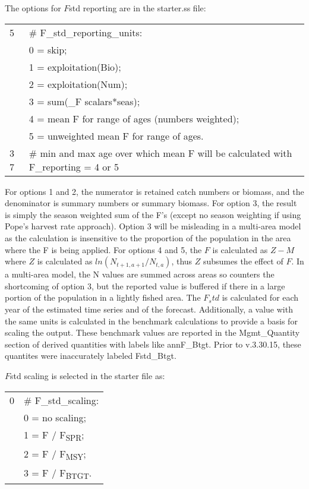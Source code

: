 The options for $F$std reporting are in the starter.ss file:
\begin{center}
	\begin{longtable}{p{2cm} p{12cm}}
		\hline
		5 & \# F\_std\_reporting\_units: \Tstrut\\
		  & 0 = skip; \\
		  & 1 = exploitation(Bio); \\
		  & 2 = exploitation(Num); \\ 
		  & 3 = sum(\_F scalars*seas); \\
		  & 4 = mean F for range of ages (numbers weighted); \\
		  & 5 = unweighted mean F for range of ages. \Bstrut\\
		\hline
		3 7 & \# min and max age over which mean F will be calculated with F\_reporting = 4 or 5 \Tstrut\Bstrut\\
		\hline
	\end{longtable}
\end{center}

For options 1 and 2, the numerator is retained catch numbers or biomass, and the denominator is summary numbers or summary biomass.
For option 3, the result is simply the season weighted sum of the F's (except no season weighting if using Pope's harvest rate approach). Option 3 will be misleading in a multi-area model as the calculation is insensitive to the proportion of the population in the area where the F is being applied.
For options 4 and 5, the $F$ is calculated as $Z-M$ where $Z$ is calculated as $ln(N_{t+1,a+1}/N_{t,a})$, thus $Z$ subsumes the effect of $F$.  In a multi-area model, the N values are summed across areas so counters the shortcoming of option 3, but the reported value is buffered if there in a large portion of the population in a lightly fished area.
The $F_std$ is calculated for each year of the estimated time series and of the forecast. Additionally, a value with the same units is calculated in the benchmark calculations to provide a basis for scaling the output. These benchmark values are reported in the Mgmt_Quantity section of derived quantities with labels like annF_Btgt. 
 Prior to v.3.30.15, these quantites were inaccurately labeled Fstd\_Btgt.

$F$std scaling is selected in the starter file as:
\begin{center}
	\begin{longtable}{p{2cm} p{12cm}}
		\hline
		0 & \# F\_std\_scaling: \Tstrut\\
		& 0 = no scaling; \\
		& 1 = F / F\textsubscript{SPR}; \\ 
		& 2 = F / F\textsubscript{MSY}; \\
		& 3 = F / F\textsubscript{BTGT}.\Bstrut\\
		\hline
	\end{longtable}
\end{center}

